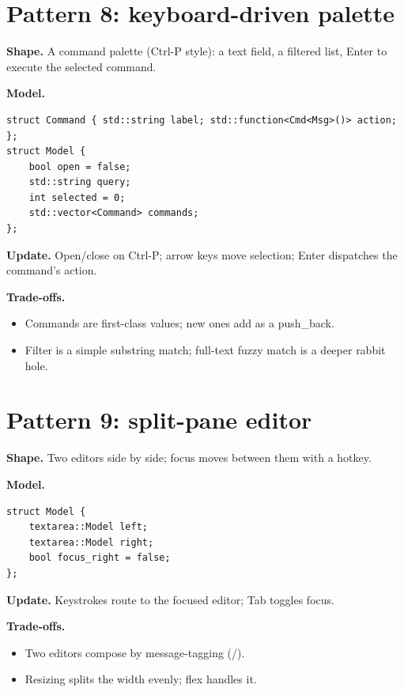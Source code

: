 \section{Pattern 8: keyboard-driven palette}

\textbf{Shape.} A command palette (Ctrl-P style): a text field, a
filtered list, Enter to execute the selected command.

\textbf{Model.}

\begin{lstlisting}
struct Command { std::string label; std::function<Cmd<Msg>()> action; };
struct Model {
    bool open = false;
    std::string query;
    int selected = 0;
    std::vector<Command> commands;
};
\end{lstlisting}

\textbf{Update.} Open/close on Ctrl-P; arrow keys move
selection; Enter dispatches the command's action.

\textbf{Trade-offs.}

\begin{itemize}[leftmargin=*]
  \item Commands are first-class values; new ones add as a
    push\_back.
  \item Filter is a simple substring match; full-text fuzzy
    match is a deeper rabbit hole.
\end{itemize}

\section{Pattern 9: split-pane editor}

\textbf{Shape.} Two editors side by side; focus moves between
them with a hotkey.

\textbf{Model.}

\begin{lstlisting}
struct Model {
    textarea::Model left;
    textarea::Model right;
    bool focus_right = false;
};
\end{lstlisting}

\textbf{Update.} Keystrokes route to the focused editor; Tab
toggles focus.

\textbf{Trade-offs.}

\begin{itemize}[leftmargin=*]
  \item Two editors compose by message-tagging
    (/).
  \item Resizing splits the width evenly; flex handles it.
\end{itemize}

